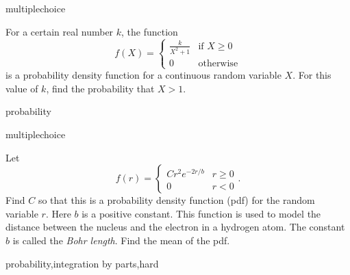 \documentclass{ximera}
\begin{document}
\begin{question}[2016C.07]
\begin{type}
multiplechoice
\end{type}
For a certain real number \(k\), the function
\[ f(X) = \begin{cases} \displaystyle \frac{k}{X^2+1} & \text{if } X \geq 0 \\ 0 & \text{otherwise} \end{cases} \]
is a probability density function for a continuous random variable \(X\). For this value of \(k\), find the probability that \(X > 1\).
\begin{multiplechoice}
\end{multiplechoice}
\begin{keywords}
probability
\end{keywords}
\end{question}

\begin{question}[2017C.09]
\begin{type}
multiplechoice
\end{type}
Let \[ f(r) = \begin{cases} C r^2 e^{-2r/b} & r \geq 0 \\ 0 & r < 0 \end{cases}. \]
Find \(C\) so that this is a probability density function (pdf) for the random variable \(r\). Here \(b\) is a positive constant. This function is used to model the distance between the nucleus and the electron in a hydrogen atom. The constant \(b\) is called the \textit{Bohr length}. Find the mean of the pdf.
\begin{multiplechoice}
 \choicebreak
{}
\end{multiplechoice}
\begin{keywords}
probability,integration by parts,hard
\end{keywords}
\end{question}
\end{document}
